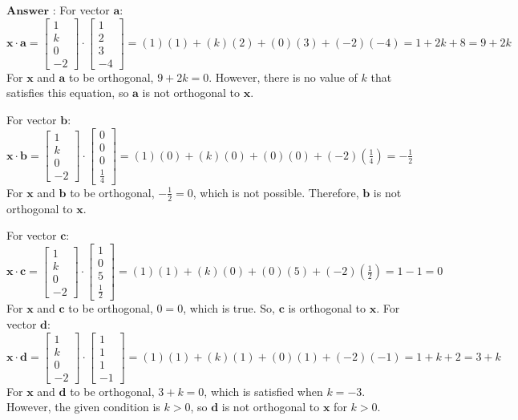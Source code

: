 \documentclass[11pt]{article}
\begin{document}
$\textbf{Answer :}$
    For vector $\mathbf{a}$: $ \mathbf{x} \cdot \mathbf{a} =
\begin{bmatrix} 1 \\ k \\ 0 \\ -2 \end{bmatrix}
\cdot 
\begin{bmatrix} 1 \\ 2 \\ 3 \\ -4 \end{bmatrix}
= (1)(1) + (k)(2) + (0)(3) + (-2)(-4) = 1 + 2k + 8 = 9 + 2k $ For
$\mathbf{x}$ and $\mathbf{a}$ to be orthogonal, $9 + 2k = 0$.
However, there is no value of $k$ that satisfies this equation, so
$\mathbf{a}$ is not orthogonal to $\mathbf{x}$.

For vector $\mathbf{b}$: $ \mathbf{x} \cdot \mathbf{b} =
\begin{bmatrix} 1 \\ k \\ 0 \\ -2 \end{bmatrix}
\cdot 
\begin{bmatrix} 0 \\ 0 \\ 0 \\ \frac{1}{4} \end{bmatrix}
= (1)(0) + (k)(0) + (0)(0) + (-2)\left(\frac{1}{4}\right) = -\frac{1}{2}
$ For $\mathbf{x}$ and $\mathbf{b}$ to be orthogonal,
$-\frac{1}{2} = 0$, which is not possible. Therefore, $\mathbf{b}$
is not orthogonal to $\mathbf{x}$.

For vector $\mathbf{c}$: $ \mathbf{x} \cdot \mathbf{c} =
\begin{bmatrix} 1 \\ k \\ 0 \\ -2 \end{bmatrix}
\cdot 
\begin{bmatrix} 1 \\ 0 \\ 5 \\ \frac{1}{2} \end{bmatrix}
= (1)(1) + (k)(0) + (0)(5) + (-2)\left(\frac{1}{2}\right) = 1 - 1 = 0 $
For $\mathbf{x}$ and $\mathbf{c}$ to be orthogonal, $0 = 0$, which
is true. So, $\mathbf{c}$ is orthogonal to $\mathbf{x}$.
For vector $\mathbf{d}$: $ \mathbf{x} \cdot \mathbf{d} =
\begin{bmatrix} 1 \\ k \\ 0 \\ -2 \end{bmatrix}
\cdot 
\begin{bmatrix} 1 \\ 1 \\ 1 \\ -1 \end{bmatrix}
= (1)(1) + (k)(1) + (0)(1) + (-2)(-1) = 1 + k + 2 = 3 + k $ For
$\mathbf{x}$ and $\mathbf{d}$ to be orthogonal, $3 + k = 0$, which
is satisfied when $k = -3$. However, the given condition is $k > 0$,
so $\mathbf{d}$ is not orthogonal to $\mathbf{x}$ for $k > 0$.
\end{document}
